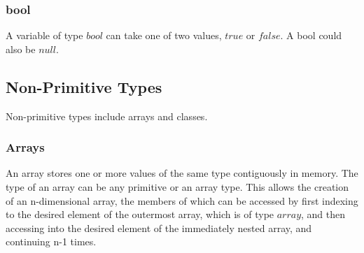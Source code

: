 \begin{homeworkProblem}
	\subsubsection{bool}
	
	A variable of type $bool$ can take one of two values, $true$ or $false$. A bool could also be $null$.\\
	
	\subsection{Non-Primitive Types}
	Non-primitive types include arrays and classes.
	\subsubsection{Arrays}
	An array stores one or more values of the same type contiguously in memory. The type of an array can be any primitive or an array type. This allows the creation of an n-dimensional array, the members of which can be accessed by first indexing to the desired element of the outermost array, which is of type $array$, and then accessing into the desired element of the immediately nested array, and continuing n-1 times.

\end{homeworkProblem}
